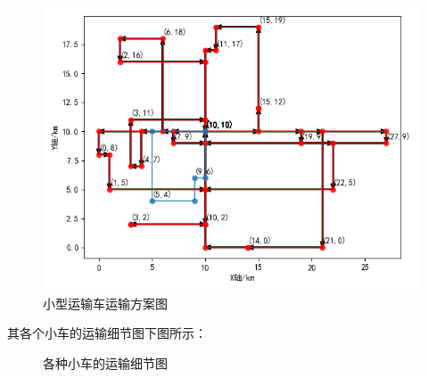 \documentclass{whutmod}
\begin{document}
    \begin{figure}[H]
    	\centering
    	\includegraphics[width=\textwidth]{figures/ss.png}
    	\caption{小型运输车运输方案图}\label{ssssssssss}
    \end{figure}
    
    其各个小车的运输细节图下图所示：
    	
    \begin{figure}[H]	
    	\centering
    	\caption{各种小车的运输细节图}
    	\label{fissssg}
    \end{figure}
\end{document}
